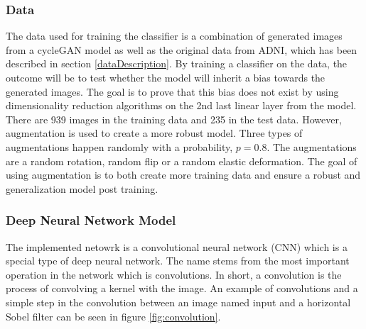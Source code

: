 \documentclass[12pt, fleqn, titlepage]{article}
\newcommand{\1}[1]{\mathds{1}\left[#1\right]}
\begin{document}
\subsubsection{Data}
The data used for training the classifier is a combination of generated images from a cycleGAN model as well as the original data from ADNI, which has been described in section \ref{dataDescription}. By training a classifier on the data, the outcome will be to test whether the model will inherit a bias towards the generated images. The goal is to prove that this bias does not exist by using dimensionality reduction algorithms on the 2nd last linear layer from the model. There are 939 images in the training data and 235 in the test data. However, augmentation is used to create a more robust model. Three types of augmentations happen randomly with a probability, $ p = 0.8 $. The augmentations are a random rotation, random flip or a random elastic deformation. The goal of using augmentation is to both create more training data and ensure a robust and generalization model post training. 

\subsubsection{Deep Neural Network Model}

	The implemented netowrk is a convolutional neural network (CNN) which is a special type of deep neural network. The name stems from the most important operation in the network which is convolutions. In short, a convolution is the process of convolving a kernel with the image. An example of convolutions and a simple step in the convolution between an image named input and a horizontal Sobel filter can be seen in figure \ref{fig:convolution}.
	
\end{document}
